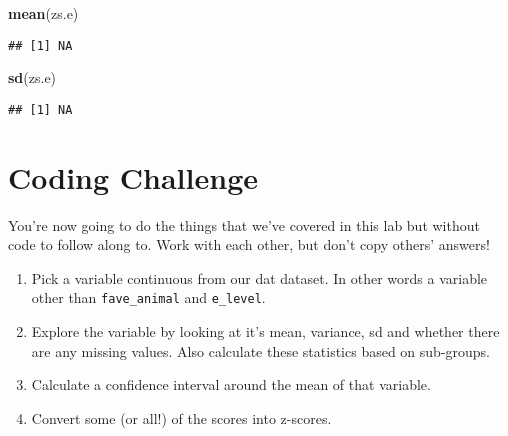 \documentclass[
]{article}
\newenvironment{Shaded}{\begin{snugshade}}{\end{snugshade}}
\newcommand{\FunctionTok}[1]{\textcolor[rgb]{0.13,0.29,0.53}{\textbf{#1}}}
\newcommand{\NormalTok}[1]{#1}
\providecommand{\tightlist}{%
  \setlength{\itemsep}{0pt}\setlength{\parskip}{0pt}}
\begin{document}
\begin{Shaded}
\begin{Highlighting}[]
\FunctionTok{mean}\NormalTok{(zs.e)}
\end{Highlighting}
\end{Shaded}

\begin{verbatim}
## [1] NA
\end{verbatim}

\begin{Shaded}
\begin{Highlighting}[]
\FunctionTok{sd}\NormalTok{(zs.e)}
\end{Highlighting}
\end{Shaded}

\begin{verbatim}
## [1] NA
\end{verbatim}

\hypertarget{coding-challenge}{%
\section{Coding Challenge}\label{coding-challenge}}

You're now going to do the things that we've covered in this lab but
without code to follow along to. Work with each other, but don't copy
others' answers!

\begin{enumerate}
\def\labelenumi{\arabic{enumi}.}
\tightlist
\item
  Pick a variable continuous from our dat dataset. In other words a
  variable other than \texttt{fave\_animal} and \texttt{e\_level}.
\item
  Explore the variable by looking at it's mean, variance, sd and whether
  there are any missing values. Also calculate these statistics based on
  sub-groups.
\item
  Calculate a confidence interval around the mean of that variable.
\item
  Convert some (or all!) of the scores into z-scores.
\end{enumerate}
\end{document}
